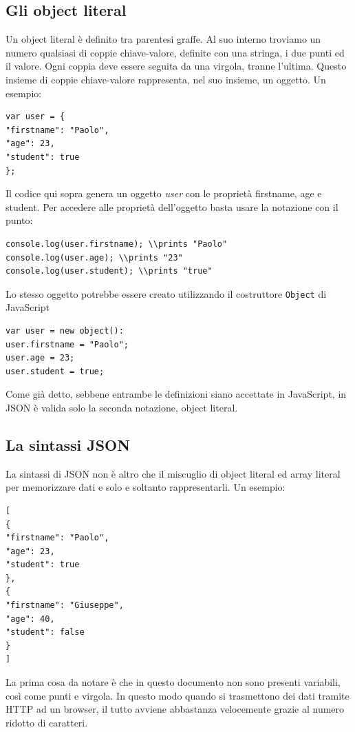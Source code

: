 \subsection{Gli object literal}
Un object literal è definito tra parentesi graffe.
Al suo interno troviamo un numero qualsiasi di coppie chiave-valore, definite con una stringa, i due punti ed il valore.
Ogni coppia deve essere seguita da una virgola, tranne l'ultima. 
Questo insieme di coppie chiave-valore rappresenta, nel suo insieme, un oggetto.
Un esempio:
\begin{lstlisting}[style=JavaScriptCode]
var user = {
"firstname": "Paolo",
"age": 23,
"student": true
};
\end{lstlisting}
Il codice qui sopra genera un oggetto \emph{user} con le proprietà firstname, age e student. 
Per accedere alle proprietà dell'oggetto basta usare la notazione con il punto:
\begin{lstlisting}[style=JavaScriptCode]
console.log(user.firstname); \\prints "Paolo"
console.log(user.age); \\prints "23"
console.log(user.student); \\prints "true"
\end{lstlisting}
Lo stesso oggetto potrebbe essere creato utilizzando il costruttore \texttt{Object} di JavaScript
\begin{lstlisting}[style=JavaScriptCode]
var user = new object():
user.firstname = "Paolo";
user.age = 23;
user.student = true;
\end{lstlisting}
Come già detto, sebbene entrambe le definizioni siano accettate in JavaScript, in JSON è valida solo la seconda notazione, object literal.
\subsection{La sintassi JSON}
La sintassi di JSON non è altro che il miscuglio di object literal ed array literal per memorizzare dati e solo e soltanto rappresentarli.
Un esempio:
\begin{lstlisting}[style=JavaScriptCode]
[
{
"firstname": "Paolo",
"age": 23,
"student": true
},
{
"firstname": "Giuseppe",
"age": 40,
"student": false
}
]
\end{lstlisting}
La prima cosa da notare è che in questo documento non sono presenti variabili, così come punti e virgola.
In questo modo quando si trasmettono dei dati tramite HTTP ad un browser, il tutto avviene abbastanza velocemente grazie al numero ridotto di caratteri.

